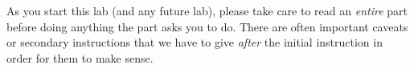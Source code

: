\documentclass{article}
\begin{document}
\thispagestyle{empty}
As you start this lab (and any future lab), please take care to
read an \emph{entire} part before doing anything the part asks you to
do. There are often important caveats or secondary instructions that
we have to give \emph{after} the initial instruction in order for them
to make sense.

\end{document}

